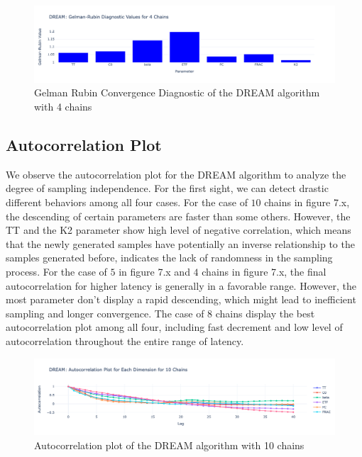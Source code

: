 \begin{figure}[H]
    \centering
    \includegraphics[width=1\textwidth]{figures/dream/gr_4.png}
    \captionsetup{width=.8\textwidth}
    \caption{Gelman Rubin Convergence Diagnostic of the DREAM algorithm with 4 chains}
    \label{fig:enter-label}
\end{figure}

\subsection{Autocorrelation Plot}
We observe the autocorrelation plot for the DREAM algorithm to analyze the degree of sampling independence. For the first sight, we can detect drastic different behaviors among all four cases. For the case of $10$ chains in figure 7.x, the descending of certain parameters are faster than some others. However, the TT and the K2 parameter show high level of negative correlation, which means that the newly generated samples have potentially an inverse relationship to the samples generated before, indicates the lack of randomness in the sampling process. For the case of $5$ in figure 7.x and $4$ chains in figure 7.x, the final autocorrelation for higher latency is generally in a favorable range. However, the most parameter don't display a rapid descending, which might lead to inefficient sampling and longer convergence. The case of $8$ chains display the best autocorrelation plot among all four, including fast decrement and low level of autocorrelation throughout the entire range of latency.
\begin{figure}[H]
    \centering
    \includegraphics[width=1\textwidth]{figures/dream/ac_10.png}
    \captionsetup{width=.8\textwidth}
    \caption{Autocorrelation plot of the DREAM algorithm with 10 chains}
    \label{fig:enter-label}
\end{figure}

